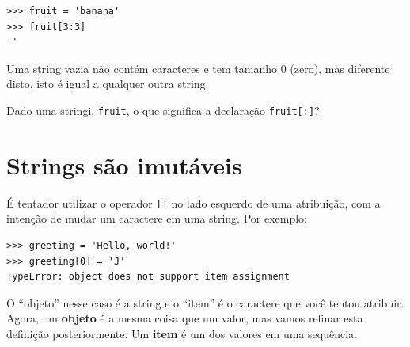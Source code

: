 {%

\beforeverb
\begin{verbatim}
>>> fruit = 'banana'
>>> fruit[3:3]
''
\end{verbatim}
\afterverb
%
%
Uma string vazia não contém caracteres e tem tamanho 0 (zero), mas diferente
disto, isto é igual a qualquer outra string.

\begin{ex}
Dado uma stringi, {\tt fruit}, o que significa a declaração {\tt fruit[:]}?
\end{ex}

\section{Strings são imutáveis}


É tentador utilizar o operador {\tt []} no lado esquerdo de uma atribuição,
com a intenção de mudar um caractere em uma string. Por exemplo:

\beforeverb
\begin{verbatim}
>>> greeting = 'Hello, world!'
>>> greeting[0] = 'J'
TypeError: object does not support item assignment
\end{verbatim}
\afterverb
%
%
O ``objeto'' nesse caso é a string e o ``item'' é o caractere que você tentou
atribuir. Agora, um {\bf objeto} é a mesma coisa que um valor, mas vamos
refinar esta definição posteriormente. Um {\bf item} é um dos valores em uma
sequência.

}
